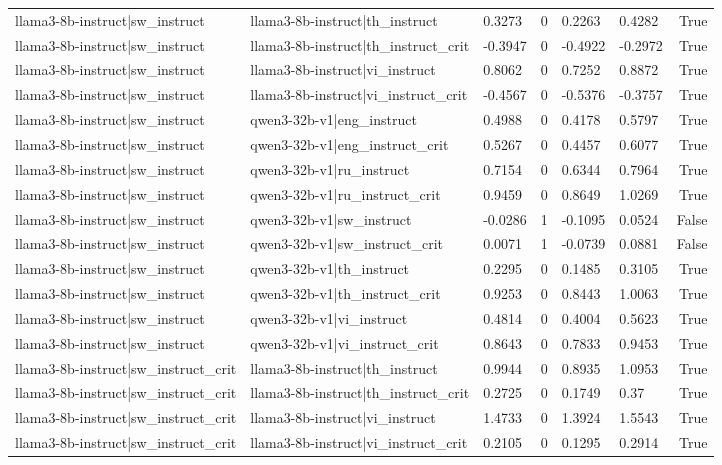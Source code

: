 \begin{table}
\begin{tabular}{llllllr}
llama3-8b-instruct|sw_instruct & llama3-8b-instruct|th_instruct & 0.3273 & 0 & 0.2263 & 0.4282 & True \\
llama3-8b-instruct|sw_instruct & llama3-8b-instruct|th_instruct_crit & -0.3947 & 0 & -0.4922 & -0.2972 & True \\
llama3-8b-instruct|sw_instruct & llama3-8b-instruct|vi_instruct & 0.8062 & 0 & 0.7252 & 0.8872 & True \\
llama3-8b-instruct|sw_instruct & llama3-8b-instruct|vi_instruct_crit & -0.4567 & 0 & -0.5376 & -0.3757 & True \\
llama3-8b-instruct|sw_instruct & qwen3-32b-v1|eng_instruct & 0.4988 & 0 & 0.4178 & 0.5797 & True \\
llama3-8b-instruct|sw_instruct & qwen3-32b-v1|eng_instruct_crit & 0.5267 & 0 & 0.4457 & 0.6077 & True \\
llama3-8b-instruct|sw_instruct & qwen3-32b-v1|ru_instruct & 0.7154 & 0 & 0.6344 & 0.7964 & True \\
llama3-8b-instruct|sw_instruct & qwen3-32b-v1|ru_instruct_crit & 0.9459 & 0 & 0.8649 & 1.0269 & True \\
llama3-8b-instruct|sw_instruct & qwen3-32b-v1|sw_instruct & -0.0286 & 1 & -0.1095 & 0.0524 & False \\
llama3-8b-instruct|sw_instruct & qwen3-32b-v1|sw_instruct_crit & 0.0071 & 1 & -0.0739 & 0.0881 & False \\
llama3-8b-instruct|sw_instruct & qwen3-32b-v1|th_instruct & 0.2295 & 0 & 0.1485 & 0.3105 & True \\
llama3-8b-instruct|sw_instruct & qwen3-32b-v1|th_instruct_crit & 0.9253 & 0 & 0.8443 & 1.0063 & True \\
llama3-8b-instruct|sw_instruct & qwen3-32b-v1|vi_instruct & 0.4814 & 0 & 0.4004 & 0.5623 & True \\
llama3-8b-instruct|sw_instruct & qwen3-32b-v1|vi_instruct_crit & 0.8643 & 0 & 0.7833 & 0.9453 & True \\
llama3-8b-instruct|sw_instruct_crit & llama3-8b-instruct|th_instruct & 0.9944 & 0 & 0.8935 & 1.0953 & True \\
llama3-8b-instruct|sw_instruct_crit & llama3-8b-instruct|th_instruct_crit & 0.2725 & 0 & 0.1749 & 0.37 & True \\
llama3-8b-instruct|sw_instruct_crit & llama3-8b-instruct|vi_instruct & 1.4733 & 0 & 1.3924 & 1.5543 & True \\
llama3-8b-instruct|sw_instruct_crit & llama3-8b-instruct|vi_instruct_crit & 0.2105 & 0 & 0.1295 & 0.2914 & True \\

\end{tabular}
\end{table}
